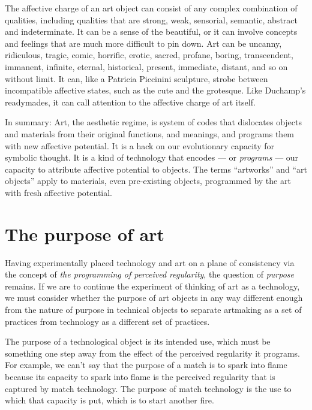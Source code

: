 \documentclass[letterpaper]{article}
\begin{document}
    The affective charge of an art object can consist of any complex combination of qualities, including qualities that are strong, weak, sensorial, semantic, abstract and indeterminate. It can be a sense of the beautiful, or it can involve concepts and feelings that are much more difficult to pin down. Art can be uncanny, ridiculous, tragic, comic, horrific, erotic, sacred, profane, boring, transcendent, immanent, infinite, eternal, historical, present, immediate, distant, and so on without limit. It can, like a Patricia Piccinini sculpture, strobe between incompatible affective states, such as the cute and the grotesque. Like Duchamp's readymades, it can call attention to the affective charge of art itself.

    In summary: Art, the aesthetic regime, is system of codes that dislocates objects and materials from their original functions, and meanings, and programs them with new affective potential. It is a hack on our evolutionary capacity for symbolic thought. It is a kind of technology that encodes — or \emph{programs} — our capacity to attribute affective potential to objects. The terms “artworks” and “art objects” apply to materials, even pre-existing objects, programmed by the art with fresh affective potential.
    
\section{The purpose of art}

    Having experimentally placed technology and art on a plane of consistency via the concept of \emph{the programming of perceived regularity}, the question of \emph{purpose} remains. If we are to continue the experiment of thinking of art as a technology, we must consider whether the purpose of art objects in any way different enough from the nature of purpose in technical objects to separate artmaking as a set of practices from technology as a different set of practices.
    
    The purpose of a technological object is its intended use, which must be something one step away from the effect of the perceived regularity it programs. For example, we can't say that the purpose of a match is to spark into flame because its capacity to spark into flame is the perceived regularity that is captured by match technology. The purpose of match technology is the use to which that capacity is put, which is to start another fire. 
    
\end{document}
